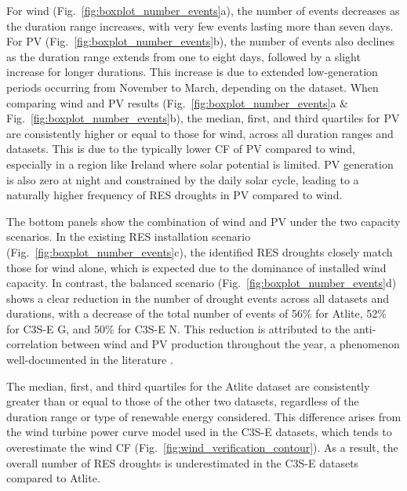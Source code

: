 \documentclass[a4paper, 11pt]{article}
\begin{document}
For wind (Fig.~\ref{fig:boxplot_number_events}a), the number of events decreases as the duration range increases, with very few events lasting more than seven days. For PV (Fig.~\ref{fig:boxplot_number_events}b), the number of events also declines as the duration range extends from one to eight days, followed by a slight increase for longer durations. This increase is due to extended low-generation periods occurring from November to March, depending on the dataset. When comparing wind and PV results (Fig.~\ref{fig:boxplot_number_events}a \& Fig.~\ref{fig:boxplot_number_events}b), the median, first, and third quartiles for PV are consistently higher or equal to those for wind, across all duration ranges and datasets. This is due to the typically lower CF of PV compared to wind, especially in a region like Ireland where solar potential is limited. PV generation is also zero at night and constrained by the daily solar cycle, leading to a naturally higher frequency of RES droughts in PV compared to wind.

The bottom panels show the combination of wind and PV under the two capacity scenarios. In the existing RES installation scenario (Fig.~\ref{fig:boxplot_number_events}c), the identified RES droughts closely match those for wind alone, which is expected due to the dominance of installed wind capacity. In contrast, the balanced scenario (Fig.~\ref{fig:boxplot_number_events}d) shows a clear reduction in the number of drought events across all datasets and durations, with a decrease of the total number of events of 56\% for Atlite, 52\% for C3S-E G, and 50\% for C3S-E N. This reduction is attributed to the anti-correlation between wind and PV production throughout the year, a phenomenon well-documented in the literature \cite{kaspar2019drought}.

The median, first, and third quartiles for the Atlite dataset are consistently greater than or equal to those of the other two datasets, regardless of the duration range or type of renewable energy considered. This difference arises from the wind turbine power curve model used in the C3S-E datasets, which tends to overestimate the wind CF (Fig.~\ref{fig:wind_verification_contour}). As a result, the overall number of RES droughts is underestimated in the C3S-E datasets compared to Atlite. 
\end{document}
